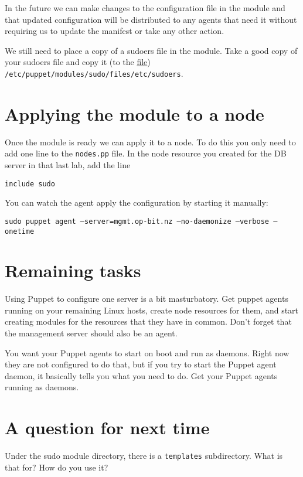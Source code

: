 \documentclass{article}   	%
\begin{document}
In the future we can make changes to the configuration file in the module and that updated configuration will be distributed to any agents that need it without requiring us to update the manifest or take any other action.

We still need to place a copy of a sudoers file in the module.  Take a good copy of your sudoers file and copy it (to the \underline{file}) \texttt{/etc/puppet/modules/sudo/files/etc/sudoers}.

\section*{Applying the module to a node}
Once the module is ready we can apply it to a node.  To do this you only need to add one line to the \texttt{nodes.pp} file.  In the node resource you created for the DB server in that last lab, add the line

\texttt{include sudo}

You can watch the agent apply the configuration by starting it manually:

\texttt{sudo puppet agent --server=mgmt.op-bit.nz --no-daemonize --verbose --onetime}

\section*{Remaining tasks}
Using Puppet to configure one server is a bit masturbatory.  Get puppet agents running on your remaining Linux hosts, create node resources for them, and start creating modules for the resources that they have in common.  Don't forget that the management server should also be an agent.

You want your Puppet agents to start on boot and run as daemons.  Right now they are not configured to do that, but if you try to start the Puppet agent daemon, it basically tells you what you need to do.  Get your Puppet agents running as daemons. 

\section*{A question for next time}
Under the sudo module directory, there is a \texttt{templates} subdirectory.  What is that for?  How do you use it?
\end{document}
